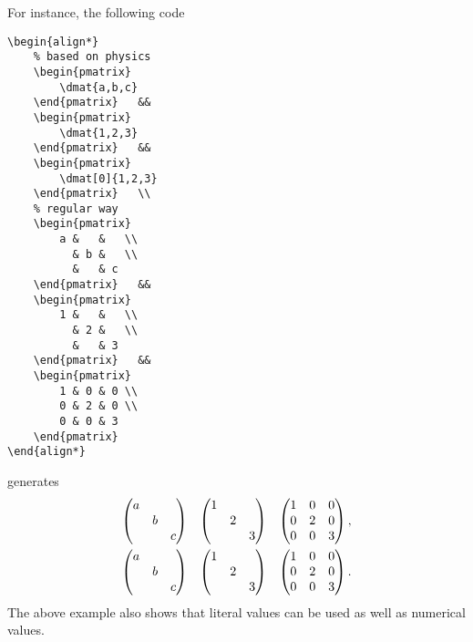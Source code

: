 			For instance, the following code
\begin{lstlisting}[language={[LaTeX]TeX}]
\begin{align*}
	% based on physics
	\begin{pmatrix}
		\dmat{a,b,c}
	\end{pmatrix}	&&
	\begin{pmatrix}
		\dmat{1,2,3}
	\end{pmatrix}	&&
	\begin{pmatrix}
		\dmat[0]{1,2,3}
	\end{pmatrix}	\\
	% regular way
	\begin{pmatrix}
		a &   &   \\
		  & b &   \\
		  &   & c
	\end{pmatrix}	&&
	\begin{pmatrix}
		1 &   &   \\
		  & 2 &   \\
		  &   & 3
	\end{pmatrix}	&&
	\begin{pmatrix}
		1 & 0 & 0 \\
		0 & 2 & 0 \\
		0 & 0 & 3
	\end{pmatrix}
\end{align*}
\end{lstlisting}
			generates
			\begin{align*}
				\begin{pmatrix}
					\dmat{a,b,c}
				\end{pmatrix}	&&
				\begin{pmatrix}
					\dmat{1,2,3}
				\end{pmatrix}	&&
				\begin{pmatrix}
					\dmat[0]{1,2,3}
				\end{pmatrix},	\\
				\begin{pmatrix}
					a &   &   \\
					  & b &   \\
					  &   & c
				\end{pmatrix}	&&
				\begin{pmatrix}
					1 &   &   \\
					  & 2 &   \\
					  &   & 3
				\end{pmatrix}	&&
				\begin{pmatrix}
					1 & 0 & 0 \\
					0 & 2 & 0 \\
					0 & 0 & 3
				\end{pmatrix}.
			\end{align*}
			The above example also shows that literal values can be used as well as numerical values.
			
